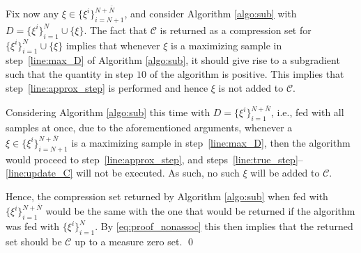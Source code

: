 \begin{enumerate}[wide, labelwidth=!, labelindent=0pt]
Fix now any $\xi \in \{\xi^i\}_{i=N+1}^{N+\bar{N}}$, and consider 
Algorithm \ref{algo:sub} with $D = \{\xi^i\}_{i=1}^{N} \cup \{\xi\}$. The fact that $\mathcal{C}$ is returned as a compression set for $\{\xi^i\}_{i=1}^{N} \cup \{\xi\}$ implies that whenever $\xi$ is a maximizing sample in step~\ref{line:max_D} of Algorithm \ref{algo:sub}, it should give rise to a subgradient such that the quantity in step $10$ of the algorithm is positive. This implies that step~\ref{line:approx_step} is performed and hence $\xi$ is not added to $\mathcal{C}$. 

Considering Algorithm \ref{algo:sub} this time with $D =\{\xi^i\}_{i=1}^{N+\bar{N}}$, i.e., fed with all samples at once, due to the aforementioned arguments, whenever a $\xi \in \{\xi^i\}_{i=N+1}^{N+\bar{N}}$ is a maximizing sample in step~\ref{line:max_D}, then the algorithm would proceed to step~\ref{line:approx_step}, and steps~\ref{line:true_step}--\ref{line:update_C} will not be executed. As such, no such $\xi$ will be added to $\mathcal{C}$. 

Hence, the compression set returned by Algorithm \ref{algo:sub} when fed with $\{\xi^i\}_{i=1}^{N+\bar{N}}$ would be the same with the one that would be returned if the algorithm was fed with $\{\xi^i\}_{i=1}^{N}$. By \eqref{eq:proof_nonassoc} this then implies that the returned set should be $\mathcal{C}$ up to a measure zero set. \qed

\end{enumerate}